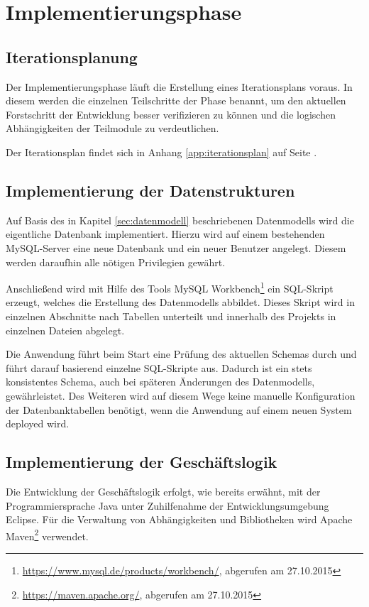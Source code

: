 \documentclass[12pt, xcolor=dvipsnames]{scrartcl}
\begin{document}
\section{Implementierungsphase}

\subsection{Iterationsplanung}

Der Implementierungsphase läuft die Erstellung eines Iterationsplans voraus. In diesem werden die einzelnen Teilschritte der Phase benannt, um den aktuellen Forstschritt der Entwicklung besser verifizieren zu können und die logischen Abhängigkeiten der Teil\-module zu verdeutlichen.

Der Iterationsplan findet sich in Anhang \ref{app:iterationsplan} auf Seite \pageref{app:iterationsplan}.

\subsection{Implementierung der Datenstrukturen}

Auf Basis des in Kapitel \ref{sec:datenmodell} beschriebenen Datenmodells wird die eigentliche Datenbank implementiert. Hierzu wird auf einem bestehenden MySQL-Server eine neue Datenbank und ein neuer Benutzer angelegt. Diesem werden daraufhin alle nötigen Privilegien gewährt.

Anschließend wird mit Hilfe des Tools
MySQL Workbench\footnote{\url{https://www.mysql.de/products/workbench/}, abgerufen am 27.10.2015} ein SQL-Skript erzeugt, welches die Erstellung des Datenmodells abbildet. Dieses Skript wird in einzelnen Abschnitte nach Tabellen unterteilt und innerhalb des Projekts in einzelnen Dateien abgelegt.


Die Anwendung führt beim Start eine Prüfung des aktuellen Schemas durch und führt darauf basierend einzelne SQL-Skripte aus. Dadurch ist ein stets konsistentes Schema, auch bei späteren Änderungen des Datenmodells, gewährleistet. Des Weiteren wird auf diesem Wege keine manuelle Konfiguration der Datenbanktabellen benötigt, wenn die Anwendung auf einem neuen System deployed wird.

\subsection{Implementierung der Geschäftslogik}

Die Entwicklung der Geschäftslogik erfolgt, wie bereits erwähnt, mit der Programmiersprache Java unter Zuhilfenahme der Entwicklungsumgebung Eclipse. Für die Verwaltung von Abhängigkeiten und Bibliotheken wird
Apache Maven\footnote{\url{https://maven.apache.org/}, abgerufen am 27.10.2015}
verwendet.
\end{document}
